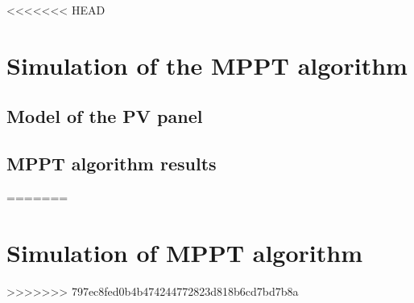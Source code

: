 <<<<<<< HEAD
\section{Simulation of the MPPT algorithm} \label{MPPTSimulation}
\subsection{Model of the PV panel}
\subsection{MPPT algorithm results}
=======
\section{Simulation of MPPT algorithm}\label{MPPTSimulation}
>>>>>>> 797ec8fed0b4b474244772823d818b6cd7bd7b8a
